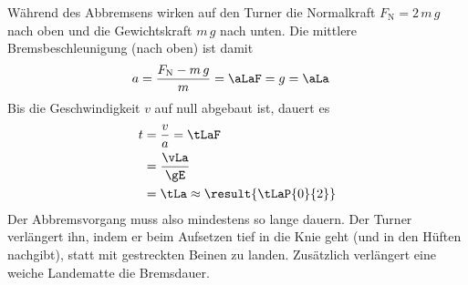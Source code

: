 Während des Abbremsens wirken auf den Turner die Normalkraft $F_\text{N} = 2\,m\,g$ nach oben und die Gewichtskraft $m\,g$ nach unten. Die mittlere Bremsbeschleunigung (nach oben) ist damit
\begin{align}
 a &= \frac{F_\text{N}-m\,g}{m} = \aLaF = g = \aLa
\end{align}
Bis die Geschwindigkeit $v$ auf null abgebaut ist, dauert es
\begin{align}
 t &= \frac{v}{a} = \tLaF \\
   &= \frac{\vLa}{\gE} \\
   &= \tLa \approx \result{\tLaP{0}{2}}
\end{align}
Der Abbremsvorgang muss also mindestens so lange dauern. Der Turner verlängert ihn, indem er beim Aufsetzen tief in die Knie geht (und in den Hüften nachgibt), statt mit gestreckten Beinen zu landen. Zusätzlich verlängert eine weiche Landematte die Bremsdauer.
